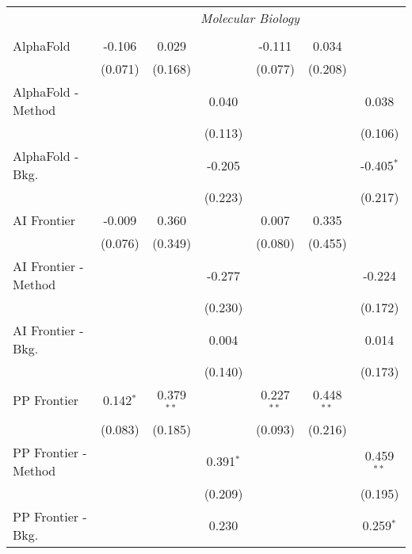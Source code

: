\begin{tabular}{lcccccc}
 & \multicolumn{6}{c}{\textit{Molecular Biology}} \\ \\
   AlphaFold            & -0.106      & 0.029        &             & -0.111       & 0.034        &   \\   
                        & (0.071)     & (0.168)      &             & (0.077)      & (0.208)      &   \\   
   AlphaFold - Method   &             &              & 0.040       &              &              & 0.038\\   
                        &             &              & (0.113)     &              &              & (0.106)\\   
   AlphaFold - Bkg.     &             &              & -0.205      &              &              & -0.405$^{*}$\\   
                        &             &              & (0.223)     &              &              & (0.217)\\   
   AI Frontier          & -0.009      & 0.360        &             & 0.007        & 0.335        &   \\   
                        & (0.076)     & (0.349)      &             & (0.080)      & (0.455)      &   \\   
   AI Frontier - Method &             &              & -0.277      &              &              & -0.224\\   
                        &             &              & (0.230)     &              &              & (0.172)\\   
   AI Frontier - Bkg.   &             &              & 0.004       &              &              & 0.014\\   
                        &             &              & (0.140)     &              &              & (0.173)\\   
   PP Frontier          & 0.142$^{*}$ & 0.379$^{**}$ &             & 0.227$^{**}$ & 0.448$^{**}$ &   \\   
                        & (0.083)     & (0.185)      &             & (0.093)      & (0.216)      &   \\   
   PP Frontier - Method &             &              & 0.391$^{*}$ &              &              & 0.459$^{**}$\\   
                        &             &              & (0.209)     &              &              & (0.195)\\   
   PP Frontier - Bkg.   &             &              & 0.230       &              &              & 0.259$^{*}$\\   

\end{tabular}
